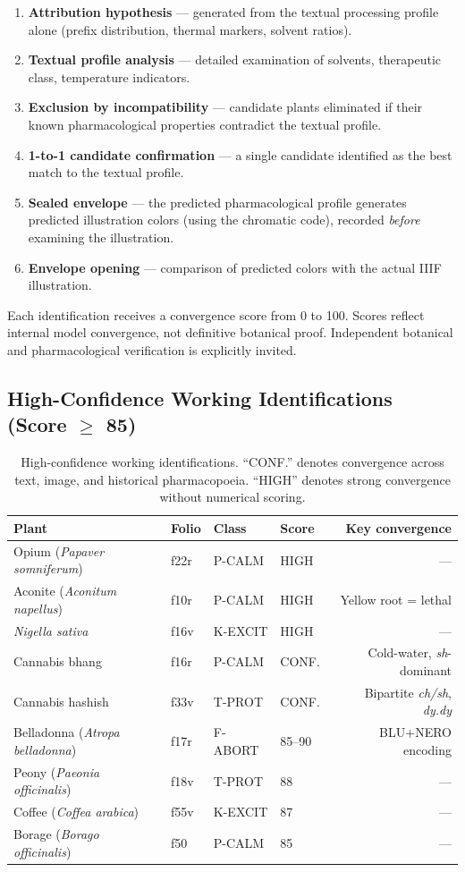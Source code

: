 \documentclass[11pt,a4paper]{article}
\begin{document}
\begin{enumerate}[leftmargin=2em]
\item \textbf{Attribution hypothesis} --- generated from the textual processing profile alone (prefix distribution, thermal markers, solvent ratios).
\item \textbf{Textual profile analysis} --- detailed examination of solvents, therapeutic class, temperature indicators.
\item \textbf{Exclusion by incompatibility} --- candidate plants eliminated if their known pharmacological properties contradict the textual profile.
\item \textbf{1-to-1 candidate confirmation} --- a single candidate identified as the best match to the textual profile.
\item \textbf{Sealed envelope} --- the predicted pharmacological profile generates predicted illustration colors (using the chromatic code), recorded \textit{before} examining the illustration.
\item \textbf{Envelope opening} --- comparison of predicted colors with the actual IIIF illustration.
\end{enumerate}

Each identification receives a convergence score from 0 to 100. Scores reflect internal model convergence, not definitive botanical proof. Independent botanical and pharmacological verification is explicitly invited.

\subsection{High-Confidence Working Identifications (Score $\geq$ 85)}

\begin{table}[H]
\centering
\begin{tabular}{llllr}
\toprule
Plant & Folio & Class & Score & Key convergence \\
\midrule
Opium (\textit{Papaver somniferum}) & f22r & P-CALM & HIGH & --- \\
Aconite (\textit{Aconitum napellus}) & f10r & P-CALM & HIGH & Yellow root = lethal \\
\textit{Nigella sativa} & f16v & K-EXCIT & HIGH & --- \\
Cannabis bhang & f16r & P-CALM & CONF. & Cold-water, \textit{sh}-dominant \\
Cannabis hashish & f33v & T-PROT & CONF. & Bipartite \textit{ch/sh}, \textit{dy.dy} \\
Belladonna (\textit{Atropa belladonna}) & f17r & F-ABORT & 85--90 & BLU+NERO encoding \\
Peony (\textit{Paeonia officinalis}) & f18v & T-PROT & 88 & --- \\
Coffee (\textit{Coffea arabica}) & f55v & K-EXCIT & 87 & --- \\
Borage (\textit{Borago officinalis}) & f50 & P-CALM & 85 & --- \\
\bottomrule
\end{tabular}
\caption{High-confidence working identifications. ``CONF.'' denotes convergence across text, image, and historical pharmacopoeia. ``HIGH'' denotes strong convergence without numerical scoring.}
\end{table}
\end{document}

